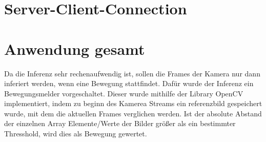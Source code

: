 

\section{Server-Client-Connection}\label{sec:serverclient}





\section{Anwendung gesamt}\label{sec:ka}

Da die Inferenz sehr rechenaufwendig ist, sollen die Frames der Kamera nur 
dann inferiert werden, wenn eine Bewegung stattfindet. Dafür wurde der 
Inferenz ein Bewegungsmelder vorgeschaltet. Dieser wurde mithilfe der Library 
OpenCV implementiert, indem zu beginn des Kamerea Streams ein referenzbild 
gespeichert wurde, mit dem die aktuellen Frames verglichen werden. 
Ist der absolute Abstand der einzelnen Array Elemente/Werte der Bilder größer 
als ein bestimmter Thresshold, wird dies als Bewegung gewertet.






